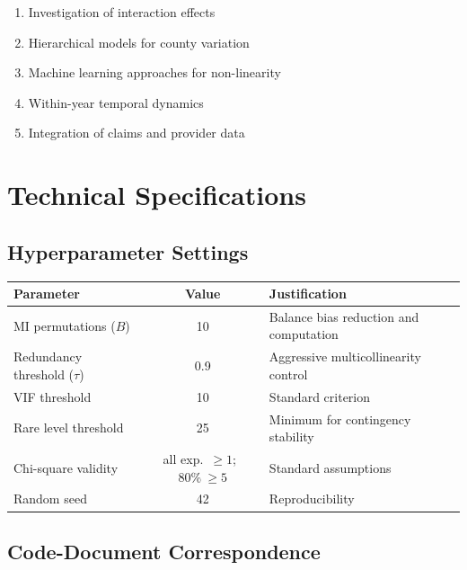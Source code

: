 \begin{enumerate}
    \item Investigation of interaction effects
    \item Hierarchical models for county variation
    \item Machine learning approaches for non-linearity
    \item Within-year temporal dynamics
    \item Integration of claims and provider data
\end{enumerate}

\section{Technical Specifications}

\subsection{Hyperparameter Settings}

\begin{center}
\begin{tabular}{|l|c|l|}
\hline
\textbf{Parameter} & \textbf{Value} & \textbf{Justification} \\
\hline
MI permutations ($B$) & 10 & Balance bias reduction and computation \\
\hline
Redundancy threshold ($\tau$) & 0.9 & Aggressive multicollinearity control \\
\hline
VIF threshold & 10 & Standard criterion \\
\hline
Rare level threshold & 25 & Minimum for contingency stability \\
\hline
Chi-square validity & all exp.\ $\ge 1$;\ $80\%\ \ge 5$ & Standard assumptions \\
\hline
Random seed & 42 & Reproducibility \\
\hline
\end{tabular}
\end{center}

\subsection{Code-Document Correspondence}

